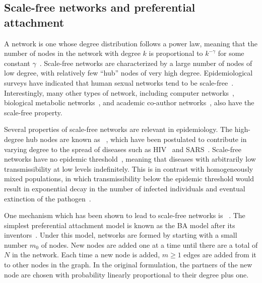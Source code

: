 \subsection{Scale-free networks and preferential attachment}
\label{subsec:pa}

A  network is one whose degree distribution follows a power
law, meaning that the number of nodes in the network with degree $k$ is
proportional to $k^{-\gamma}$ for some constant
$\gamma$~\autocite{barabasi1999emergence}. Scale-free networks are
characterized by a large number of nodes of low degree, with relatively few
``hub'' nodes of very high degree. Epidemiological surveys have indicated that
human sexual networks tend to be scale-free~\autocite{liljeros2001web,
schneeberger2004scale, colgate1989risk, clemenccon2015statistical}.
Interestingly, many other types of network, including computer
networks~\autocite{pastor2001epidemic}, biological metabolic
networks~\autocite{jeong2000large}, and academic co-author
networks~\autocite{barabasi2002evolution}, also have the scale-free property.

Several properties of scale-free networks are relevant in epidemiology.  The
high-degree hub nodes are known as
~\autocite{kemper1980identification}, which have been
postulated to contribute in varying degree to the spread of diseases such as
\gls{HIV}~\autocite{stadler2013uncovering} and
\gls{SARS}~\autocite{shen2004superspreading}. Scale-free networks have no
epidemic threshold~\autocite{pastor2001epidemic}, meaning that diseases with
arbitrarily low transmissibility   at low levels indefinitely. This is in contrast with
homogeneously mixed populations, in which transmissibility below the epidemic
threshold would result in exponential decay in the number of infected
individuals and eventual extinction of the
pathogen~\autocite{anderson1992infectious}.

One mechanism which has been shown to lead to scale-free networks is
~\autocite{simon1955class,
barabasi1999emergence}. The simplest preferential attachment model is known as
the \gls{BA} model after its inventors~\autocite{barabasi1999emergence}. Under
this model, networks are formed by starting with a small number $m_0$ of nodes.
New nodes are added one at a time until there are a total of $N$ in the
network. Each time a new node is added, $m \geq 1$ edges are added from it to
other nodes in the graph. In the original formulation, the partners of the new
node are chosen with probability linearly proportional to their degree plus
one.

